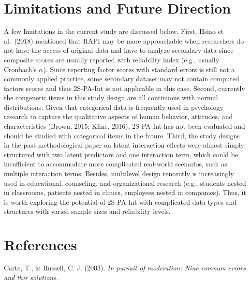 \documentclass[
  man]{apa6}
\newlength{\cslhangindent}
\newlength{\cslentryspacingunit} %
\newenvironment{CSLReferences}[2] %
 {%
  \setlength{\parindent}{0pt}
  \ifodd #1
  \let\oldpar\par
  \def\par{\hangindent=\cslhangindent\oldpar}
  \fi
  \setlength{\parskip}{#2\cslentryspacingunit}
 }%
 {}
\begin{document}
\hypertarget{limitations-and-future-direction}{%
\section{Limitations and Future Direction}\label{limitations-and-future-direction}}

A few limitations in the current study are discussed below. First, Hsiao et al.~(2018) mentioned that RAPI may be more approachable when researchers do not have the access of original data and have to analyze secondary data since composite scores are usually reported with reliability index (e.g., usually Cronbach's \(\alpha\)). Since reporting factor scores with standard errors is still not a commonly applied practice, some secondary dataset may not contain computed factors scores and thus 2S-PA-Int is not applicable in this case. Second, currently the congeneric items in this study design are all continuous with normal distributions. Given that categorical data is frequently used in psychology research to capture the qualitative aspects of human behavior, attitudes, and characteristics (Brown, 2015; Kline, 2016), 2S-PA-Int has not been evaluated and should be studied with categorical items in the future. Third, the study designs in the past methodological paper on latent interaction effects were almost simply structured with two latent predictors and one interaction term, which could be insufficient to accommodate more complicated real-world scenarios, such as multiple interaction terms. Besides, multilevel design rencently is increasingly used in educational, counseling, and organizational research (e.g., students nested in classrooms, patients nested in clinics, employees nested in companies). Thus, it is worth exploring the potential of 2S-PA-Int with complicated data types and structures with varied sample sizes and reliability levels.

\newpage

\hypertarget{references}{%
\section{References}\label{references}}

\hypertarget{refs}{}
\begin{CSLReferences}{1}{0}
\leavevmode{}%
Carte, T., \& Russell, C. J. (2003). \emph{{In pursuit of moderation}: {Nine common errors and thir solutions}}.

\end{CSLReferences}
\end{document}
